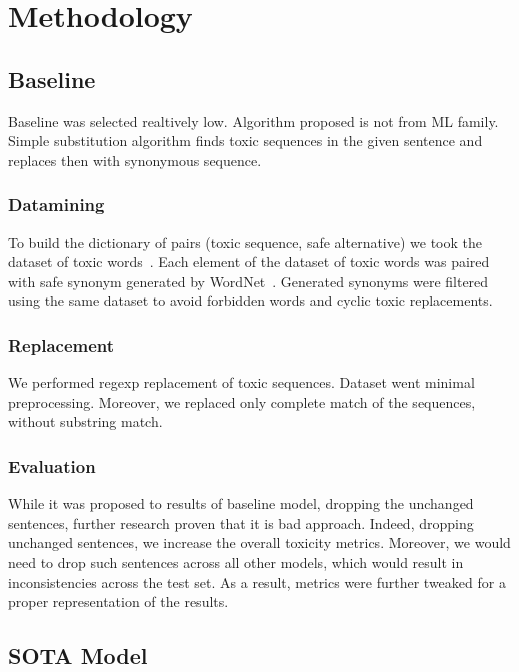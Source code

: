 \section{Methodology}

\subsection{Baseline}

Baseline was selected realtively low. Algorithm proposed is not from ML family.
Simple substitution algorithm finds toxic sequences in the given sentence and
replaces then with synonymous sequence.

\subsubsection{Datamining}

To build the dictionary of pairs (toxic sequence, safe alternative) we took the
dataset of toxic words~\cite{}. Each element of the dataset of toxic words was
paired with safe synonym generated by WordNet~\cite{}. Generated synonyms were
filtered using the same dataset to avoid forbidden words and cyclic toxic
replacements.

\subsubsection{Replacement}

We performed regexp replacement of toxic sequences. Dataset went minimal
preprocessing. Moreover, we replaced only complete match of the sequences,
without substring match.

\subsubsection{Evaluation}

While it was proposed to results of baseline model, dropping the unchanged
sentences, further research proven that it is bad approach. Indeed, dropping
unchanged sentences, we increase the overall toxicity metrics. Moreover, we
would need to drop such sentences across all other models, which would result
in inconsistencies across the test set. As a result, metrics were further
tweaked for a proper representation of the results.

\subsection{SOTA Model}

